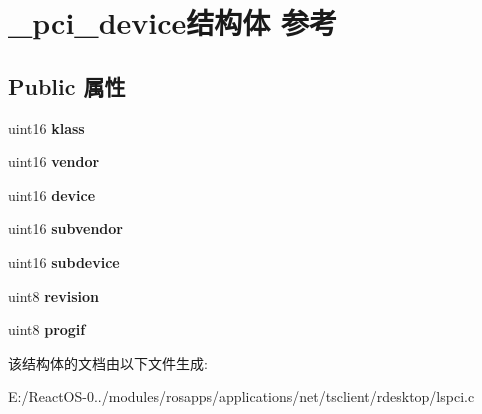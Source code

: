 \hypertarget{struct__pci__device}{}\section{\+\_\+pci\+\_\+device结构体 参考}
\label{struct__pci__device}
\subsection*{Public 属性}
\begin{DoxyCompactItemize}
\item 
\mbox{\label{struct__pci__device_a544448344a28369436eecb36fc8cdac7}} 
uint16 {\bfseries klass}
\item 
\mbox{\label{struct__pci__device_a491f66c63bb7b72c375d867b090229dd}} 
uint16 {\bfseries vendor}
\item 
\mbox{\label{struct__pci__device_a445acec49708021d0a07607427b1f8b3}} 
uint16 {\bfseries device}
\item 
\mbox{\label{struct__pci__device_a740620c64211f2a8882fd71e3e8014e8}} 
uint16 {\bfseries subvendor}
\item 
\mbox{\label{struct__pci__device_a3c0114494bc5d4fad6aabab12d0dca58}} 
uint16 {\bfseries subdevice}
\item 
\mbox{\label{struct__pci__device_a723b45c3df2be96b21bfdc82db98cd59}} 
uint8 {\bfseries revision}
\item 
\mbox{\label{struct__pci__device_a310753f8ed36dfd1fc122d454a7b9463}} 
uint8 {\bfseries progif}
\end{DoxyCompactItemize}


该结构体的文档由以下文件生成\+:\begin{DoxyCompactItemize}
\item 
E\+:/\+React\+O\+S-\/0../modules/rosapps/applications/net/tsclient/rdesktop/lspci.\+c\end{DoxyCompactItemize}
